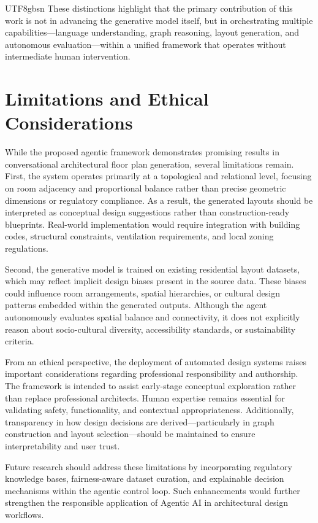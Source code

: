 \documentclass[11pt]{article}
\begin{document}
\begin{CJK}{UTF8}{gbsn}
These distinctions highlight that the primary contribution of this work is not in advancing the generative model itself, but in orchestrating multiple capabilities—language understanding, graph reasoning, layout generation, and autonomous evaluation—within a unified framework that operates without intermediate human intervention.


\section*{Limitations and Ethical Considerations}

While the proposed agentic framework demonstrates promising results in conversational architectural floor plan generation, several limitations remain. First, the system operates primarily at a topological and relational level, focusing on room adjacency and proportional balance rather than precise geometric dimensions or regulatory compliance. As a result, the generated layouts should be interpreted as conceptual design suggestions rather than construction-ready blueprints. Real-world implementation would require integration with building codes, structural constraints, ventilation requirements, and local zoning regulations.

Second, the generative model is trained on existing residential layout datasets, which may reflect implicit design biases present in the source data. These biases could influence room arrangements, spatial hierarchies, or cultural design patterns embedded within the generated outputs. Although the agent autonomously evaluates spatial balance and connectivity, it does not explicitly reason about socio-cultural diversity, accessibility standards, or sustainability criteria.

From an ethical perspective, the deployment of automated design systems raises important considerations regarding professional responsibility and authorship. The framework is intended to assist early-stage conceptual exploration rather than replace professional architects. Human expertise remains essential for validating safety, functionality, and contextual appropriateness. Additionally, transparency in how design decisions are derived—particularly in graph construction and layout selection—should be maintained to ensure interpretability and user trust.

Future research should address these limitations by incorporating regulatory knowledge bases, fairness-aware dataset curation, and explainable decision mechanisms within the agentic control loop. Such enhancements would further strengthen the responsible application of Agentic AI in architectural design workflows.






\end{CJK}
\end{document}

